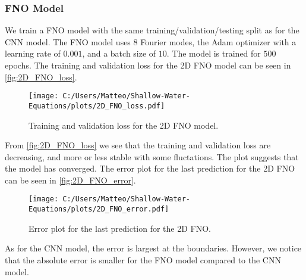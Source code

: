 \subsubsection*{FNO Model}
We train a FNO model with the same training/validation/testing split as for the CNN model.
The FNO model uses 8 Fourier modes, the Adam optimizer with a learning rate of $0.001$, and a batch size of $10$.
The model is trained for $500$ epochs.
The training and validation loss for the 2D FNO model can be seen in \autoref{fig:2D_FNO_loss}.
\begin{figure}[H]
    \centering
    \texttt{[image: C:/Users/Matteo/Shallow-Water-Equations/plots/2D\_FNO\_loss.pdf]}
    \caption{Training and validation loss for the 2D FNO model.}\label{fig:2D_FNO_loss}
\end{figure}
From \autoref{fig:2D_FNO_loss} we see that the training and validation loss are decreasing, and more or less stable with some fluctations. 
The plot suggests that the model has converged.
The error plot for the last prediction for the 2D FNO can be seen in \autoref{fig:2D_FNO_error}.
\begin{figure}[H]
    \centering
    \texttt{[image: C:/Users/Matteo/Shallow-Water-Equations/plots/2D\_FNO\_error.pdf]}
    \caption{Error plot for the last prediction for the 2D FNO.}\label{fig:2D_FNO_error}
\end{figure}
As for the CNN model, the error is largest at the boundaries.
However, we notice that the absolute error is smaller for the FNO model compared to the CNN model.

